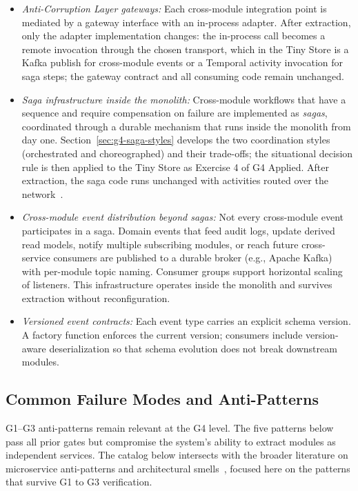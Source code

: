 \begin{itemize}[itemsep=8pt,topsep=2pt]
  \item \emph{Anti-Corruption Layer gateways:} Each cross-module integration point is mediated by a gateway interface with an in-process adapter. After extraction, only the adapter implementation changes: the in-process call becomes a remote invocation through the chosen transport, which in the Tiny Store is a Kafka publish for cross-module events or a Temporal activity invocation for saga steps; the gateway contract and all consuming code remain unchanged.

  \item \emph{Saga infrastructure inside the monolith:} Cross-module workflows that have a sequence and require compensation on failure are implemented as \emph{sagas}, coordinated through a durable mechanism that runs inside the monolith from day one. Section~\ref{sec:g4-saga-styles} develops the two coordination styles (orchestrated and choreographed) and their trade-offs; the situational decision rule is then applied to the Tiny Store as Exercise 4 of G4 Applied. After extraction, the saga code runs unchanged with activities routed over the network~\cite{newman2019monolith}.

  \item \emph{Cross-module event distribution beyond sagas:} Not every cross-module event participates in a saga. Domain events that feed audit logs, update derived read models, notify multiple subscribing modules, or reach future cross-service consumers are published to a durable broker (e.g., Apache Kafka) with per-module topic naming. Consumer groups support horizontal scaling of listeners. This infrastructure operates inside the monolith and survives extraction without reconfiguration.

  \item \emph{Versioned event contracts:} Each event type carries an explicit schema version. A factory function enforces the current version; consumers include version-aware deserialization so that schema evolution does not break downstream modules.
\end{itemize}

\subsection*{Common Failure Modes and Anti-Patterns}

G1--G3 anti-patterns remain relevant at the G4 level. The five patterns below pass all prior gates but compromise the system's ability to extract modules as independent services. The catalog below intersects with the broader literature on microservice anti-patterns and architectural smells~\cite{cerny2023tertiary, taibi2018smells}, focused here on the patterns that survive G1 to G3 verification.


